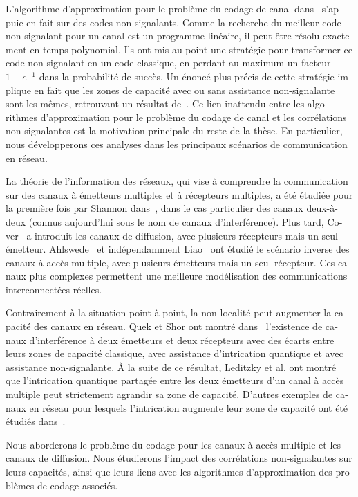 \begin{otherlanguage}{french}
L'algorithme d'approximation pour le problème du codage de canal dans~\cite{BF18} s'appuie en fait sur des codes non-signalants. Comme la recherche du meilleur code non-signalant pour un canal est un programme linéaire, il peut être résolu exactement en temps polynomial. Ils ont mis au point une stratégie pour transformer ce code non-signalant en un code classique, en perdant au maximum un facteur $1-e^{-1}$ dans la probabilité de succès. Un énoncé plus précis de cette stratégie implique en fait que les zones de capacité avec ou sans assistance non-signalante sont les mêmes, retrouvant un résultat de~\cite{Matthews12}. Ce lien inattendu entre les algorithmes d'approximation pour le problème du codage de canal et les corrélations non-signalantes est la motivation principale du reste de la thèse. En particulier, nous développerons ces analyses dans les principaux scénarios de communication en réseau.

La théorie de l'information des réseaux, qui vise à comprendre la communication sur des canaux à émetteurs multiples et à récepteurs multiples, a été étudiée pour la première fois par Shannon dans~\cite{Shannon61}, dans le cas particulier des canaux deux-à-deux (connus aujourd'hui sous le nom de canaux d'interférence). Plus tard, Cover~\cite{Cover72} a introduit les canaux de diffusion, avec plusieurs récepteurs mais un seul émetteur. Ahlswede~\cite{Ahlswede73} et indépendamment Liao~\cite{Liao73} ont étudié le scénario inverse des canaux à accès multiple, avec plusieurs émetteurs mais un seul récepteur. Ces canaux plus complexes permettent une meilleure modélisation des communications interconnectées réelles.

Contrairement à la situation point-à-point, la non-localité peut augmenter la capacité des canaux en réseau. Quek et Shor ont montré dans~\cite{QS17} l'existence de canaux d'interférence à deux émetteurs et deux récepteurs avec des écarts entre leurs zones de capacité classique, avec assistance d'intrication quantique et avec assistance non-signalante. À la suite de ce résultat, Leditzky et al. ont montré que l'intrication quantique partagée entre les deux émetteurs d'un canal à accès multiple peut strictement agrandir sa zone de capacité. D'autres exemples de canaux en réseau pour lesquels l'intrication augmente leur zone de capacité ont été étudiés dans~\cite{Noetzel20,ND20}.

Nous aborderons le problème du codage pour les canaux à accès multiple et les canaux de diffusion. Nous étudierons l'impact des corrélations non-signalantes sur leurs capacités, ainsi que leurs liens avec les algorithmes d'approximation des problèmes de codage associés.


\end{otherlanguage}

